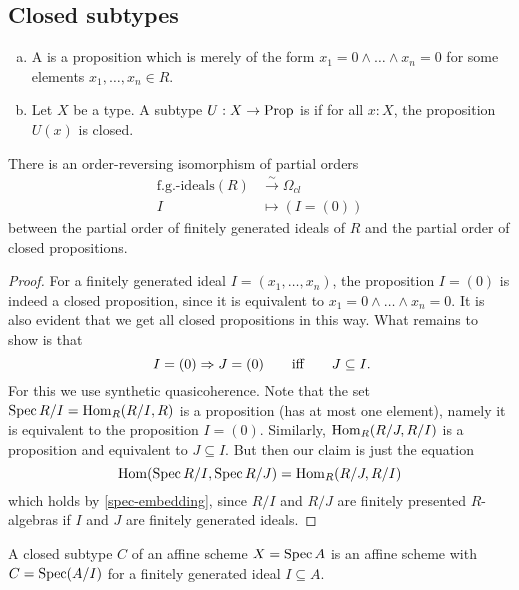 
\subsection{Closed subtypes}

\begin{definition}%
  \begin{enumerate}[(a)]
  \item
    A  is a proposition
    which is merely of the form $x_1 = 0 \land \dots \land x_n = 0$
    for some elements $x_1, \dots, x_n \in R$.
  \item
    Let $X$ be a type.
    A subtype $U : X \to \mathrm{Prop}$ is 
    if for all $x : X$, the proposition $U(x)$ is closed.
  \end{enumerate}
\end{definition}

\begin{proposition}%
  There is an order-reversing isomorphism of partial orders
  \begin{align*}
    \text{f.g.-ideals}(R) &\xrightarrow{{\sim}} \Omega_{cl} \\
    I &\mapsto (I = (0))
  \end{align*}
  between the partial order of finitely generated ideals of $R$
  and the partial order of closed propositions.
\end{proposition}

\begin{proof}
  For a finitely generated ideal $I = (x_1, \dots, x_n)$,
  the proposition $I = (0)$ is indeed a closed proposition,
  since it is equivalent to $x_1 = 0 \land \dots \land x_n = 0$.
  It is also evident that we get all closed propositions in this way.
  What remains to show is that
  \[ I = (0) \Rightarrow J = (0)
     \qquad\text{iff}\qquad
     J \subseteq I
     \rlap{\text{.}}
  \]
  For this we use synthetic quasicoherence.
  Note that the set $\operatorname{Spec} R/I = \mathrm{Hom}_R(R/I, R)$ is a proposition
  (has at most one element),
  namely it is equivalent to the proposition $I = (0)$.
  Similarly, $\mathrm{Hom}_R(R/J, R/I)$ is a proposition
  and equivalent to $J \subseteq I$.
  But then our claim is just the equation
  \[ \mathrm{Hom}(\operatorname{Spec} R/I, \operatorname{Spec} R/J) = \mathrm{Hom}_R(R/J, R/I) \]
  which holds by \cref{spec-embedding},
  since $R/I$ and $R/J$ are finitely presented $R$-algebras
  if $I$ and $J$ are finitely generated ideals.
\end{proof}

\begin{lemma}%
  \label{closed-subtype-affine}
  A closed subtype $C$ of an affine scheme $X=\operatorname{Spec} A$ is an affine scheme
  with $C=\operatorname{Spec} (A/I)$ for a finitely generated ideal $I\subseteq A$.
\end{lemma}

